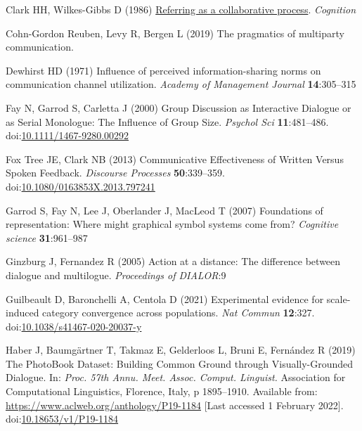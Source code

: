 \documentclass[
  english,
]{article}
\newlength{\cslhangindent}
\newlength{\cslentryspacingunit} %
\newenvironment{CSLReferences}[2] %
 {%
  \setlength{\parindent}{0pt}
  \ifodd #1
  \let\oldpar\par
  \def\par{\hangindent=\cslhangindent\oldpar}
  \fi
  \setlength{\parskip}{#2\cslentryspacingunit}
 }%
 {}
\begin{document}
\begin{CSLReferences}{1}{0}
\leavevmode{}%
Clark HH, Wilkes-Gibbs D (1986) \href{http://www.speech.kth.se/~edlund/bielefeld/references/clark-and-wilkes-gibbs-1986.pdf}{Referring as a collaborative process}. \emph{Cognition}

\leavevmode{}%
Cohn-Gordon Reuben, Levy R, Bergen L (2019) The pragmatics of multiparty communication.

\leavevmode{}%
Dewhirst HD (1971) Influence of perceived information-sharing norms on communication channel utilization. \emph{Academy of Management Journal} \textbf{14}:305--315

\leavevmode{}%
Fay N, Garrod S, Carletta J (2000) Group {Discussion} as {Interactive Dialogue} or as {Serial Monologue}: {The Influence} of {Group Size}. \emph{Psychol Sci} \textbf{11}:481--486. doi:\href{https://doi.org/10.1111/1467-9280.00292}{10.1111/1467-9280.00292}

\leavevmode{}%
Fox Tree JE, Clark NB (2013) Communicative {Effectiveness} of {Written Versus Spoken Feedback}. \emph{Discourse Processes} \textbf{50}:339--359. doi:\href{https://doi.org/10.1080/0163853X.2013.797241}{10.1080/0163853X.2013.797241}

\leavevmode{}%
Garrod S, Fay N, Lee J, Oberlander J, MacLeod T (2007) Foundations of representation: Where might graphical symbol systems come from? \emph{Cognitive science} \textbf{31}:961--987

\leavevmode{}%
Ginzburg J, Fernandez R (2005) Action at a distance: The difference between dialogue and multilogue. \emph{Proceedings of DIALOR}:9

\leavevmode{}%
Guilbeault D, Baronchelli A, Centola D (2021) Experimental evidence for scale-induced category convergence across populations. \emph{Nat Commun} \textbf{12}:327. doi:\href{https://doi.org/10.1038/s41467-020-20037-y}{10.1038/s41467-020-20037-y}

\leavevmode{}%
Haber J, Baumgärtner T, Takmaz E, Gelderloos L, Bruni E, Fernández R (2019) The {PhotoBook Dataset}: {Building Common Ground} through {Visually-Grounded Dialogue}. In: \emph{Proc. 57th {Annu}. {Meet}. {Assoc}. {Comput}. {Linguist}.} {Association for Computational Linguistics}, {Florence, Italy}, p 1895--1910. Available from: \url{https://www.aclweb.org/anthology/P19-1184} {[}Last accessed 1 February 2022{]}. doi:\href{https://doi.org/10.18653/v1/P19-1184}{10.18653/v1/P19-1184}


\end{CSLReferences}
\end{document}

